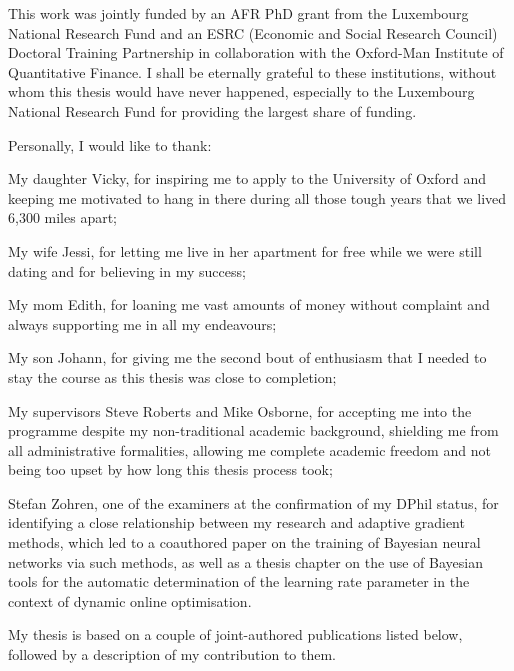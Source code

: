 
This work was jointly funded by an AFR PhD grant from the Luxembourg National Research Fund and an ESRC (Economic and Social Research Council) Doctoral Training Partnership in collaboration with the Oxford-Man Institute of Quantitative Finance. I shall be eternally grateful to these institutions, without whom this thesis would have never happened, especially to the Luxembourg National Research Fund for providing the largest share of funding.

Personally, I would like to thank:

My daughter Vicky, for inspiring me to apply to the University of Oxford and keeping me motivated to hang in there during all those tough years that we lived 6,300 miles apart;

My wife Jessi, for letting me live in her apartment for free while we were still dating and for believing in my success;

My mom Edith, for loaning me vast amounts of money without complaint and always supporting me in all my endeavours;

My son Johann, for giving me the second bout of enthusiasm that I needed to stay the course as this thesis was close to completion;

My supervisors Steve Roberts and Mike Osborne, for accepting me into the programme despite my non-traditional academic background, shielding me from all administrative formalities, allowing me complete academic freedom and not being too upset by how long this thesis process took;

\begin{mccorrection}
Stefan Zohren, one of the examiners at the confirmation of my DPhil status, for identifying a close relationship between my research and adaptive gradient methods, which led to a coauthored paper on the training of Bayesian neural networks via such methods, as well as a thesis chapter on the use of Bayesian tools for the automatic determination of the learning rate parameter in the context of dynamic online optimisation.
\end{mccorrection}

\newpage

My thesis is based on a couple of joint-authored publications listed below, followed by a description of my contribution to them.

